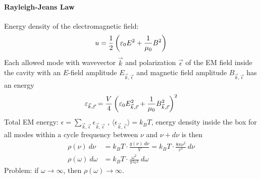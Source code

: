 \paragraph{Rayleigh-Jeans Law}
Energy density of the electromagnetic field:
\begin{align*}
    u = \frac{1}{2} \left( \varepsilon_0 E^2 + \frac{1}{\mu_0} B^2 \right)
\end{align*}
Each allowed mode with wavevector $\vec{k}$ and polarization $\vec{\epsilon}$ of the
EM field inside the cavity with an $E$-field amplitude $E_{\vec{k},\vec{\epsilon}}$
and magnetic field amplitude $B_{\vec{k},\vec{\epsilon}}$ has an energy
\begin{align*}
    \varepsilon_{\vec{k},\vec{\varepsilon}} = \frac{V}{4} \left( \varepsilon_0 E_{\vec{k},\vec{\varepsilon}}^2 + \frac{1}{\mu_0} B_{\vec{k},\vec{\varepsilon}}^2 \right)^2
\end{align*}
Total EM energy: $\epsilon = \sum_{\vec{k},\vec{\epsilon}} \epsilon_{\vec{k},\vec{\epsilon}}$ ,
$\langle \epsilon_{\vec{k},\vec{\epsilon}} \rangle = k_B T$,
energy density inside the box for all modes within a cycle frequency between $\nu$
and $\nu + d \nu$ is then
\begin{align*}
    \rho(\nu) \ d \nu &= k_B T \cdot \frac{g(\nu) \ d \nu}{V} = k_B T \cdot \frac{8 \pi \nu^2}{c^3} \ d \nu
    \\
    \rho(\omega) \ d \omega &= k_B T \cdot \frac{\omega^2}{\pi^2 c^3} \ d \omega
\end{align*}
Problem: if $\omega \rightarrow \infty$, then $\rho(\omega) \rightarrow \infty$.

